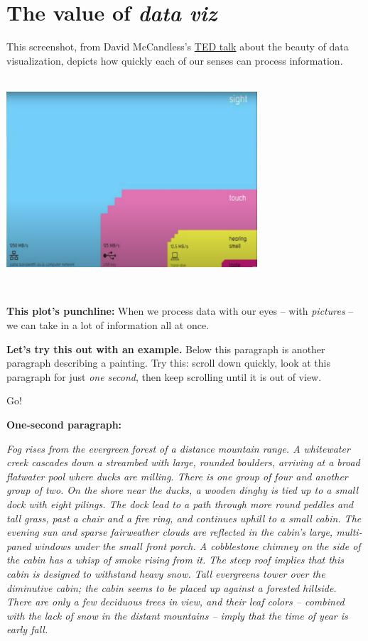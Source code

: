 \documentclass[
]{book}
\begin{document}
\hypertarget{the-value-of-data-viz}{%
\section*{\texorpdfstring{The value of \emph{data viz}}{The value of data viz}}\label{the-value-of-data-viz}}

This screenshot, from David McCandless's \href{https://www.youtube.com/watch?v=5Zg-C8AAIGg}{TED talk} about the beauty of data visualization, depicts how quickly each of our senses can process information.

~\\

\includegraphics[width=0.7\textwidth,height=\textheight]{img/vis0.png}

~

\textbf{This plot's punchline:} When we process data with our eyes -- with \emph{pictures} -- we can take in a lot of information all at once.

\textbf{Let's try this out with an example.} Below this paragraph is another paragraph describing a painting. Try this: scroll down quickly, look at this paragraph for just \emph{one second}, then keep scrolling until it is out of view.

Go!

\textbf{One-second paragraph:}

\emph{Fog rises from the evergreen forest of a distance mountain range. A whitewater creek cascades down a streambed with large, rounded boulders, arriving at a broad flatwater pool where ducks are milling. There is one group of four and another group of two. On the shore near the ducks, a wooden dinghy is tied up to a small dock with eight pilings. The dock lead to a path through more round peddles and tall grass, past a chair and a fire ring, and continues uphill to a small cabin. The evening sun and sparse fairweather clouds are reflected in the cabin's large, multi-paned windows under the small front porch. A cobblestone chimney on the side of the cabin has a whisp of smoke rising from it. The steep roof implies that this cabin is designed to withstand heavy snow. Tall evergreens tower over the diminutive cabin; the cabin seems to be placed up against a forested hillside. There are only a few deciduous trees in view, and their leaf colors -- combined with the lack of snow in the distant mountains -- imply that the time of year is early fall.}
\end{document}
